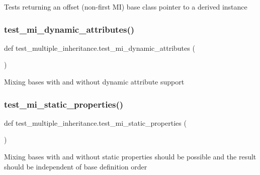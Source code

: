 \begin{DoxyVerb}Tests returning an offset (non-first MI) base class pointer to a derived instance\end{DoxyVerb}
 \mbox{\label{namespacetest__multiple__inheritance_ae863448e90221d83008bdf6befc6ffbb}} 
\subsubsection{\texorpdfstring{test\_mi\_dynamic\_attributes()}{test\_mi\_dynamic\_attributes()}}
{\footnotesize\ttfamily def test\+\_\+multiple\+\_\+inheritance.\+test\+\_\+mi\+\_\+dynamic\+\_\+attributes (\begin{DoxyParamCaption}{ }\end{DoxyParamCaption})}

\begin{DoxyVerb}Mixing bases with and without dynamic attribute support\end{DoxyVerb}
 \mbox{\label{namespacetest__multiple__inheritance_a0cff8c53411614a99a405ec39cebbd56}} 
\subsubsection{\texorpdfstring{test\_mi\_static\_properties()}{test\_mi\_static\_properties()}}
{\footnotesize\ttfamily def test\+\_\+multiple\+\_\+inheritance.\+test\+\_\+mi\+\_\+static\+\_\+properties (\begin{DoxyParamCaption}{ }\end{DoxyParamCaption})}

\begin{DoxyVerb}Mixing bases with and without static properties should be possible
 and the result should be independent of base definition order\end{DoxyVerb}
 \mbox{\label{namespacetest__multiple__inheritance_a70c8938038ff5bd7836b7a825272f803}} 
